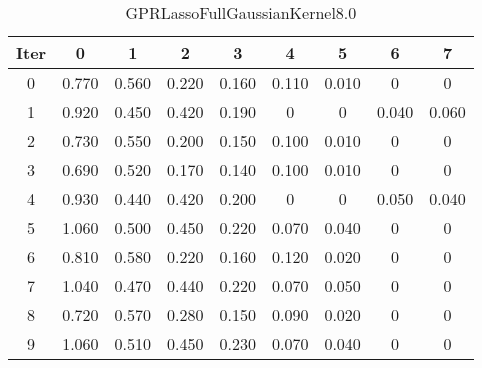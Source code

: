 \begin{table}
	\begin{center}
		\begin{tabular}{|c|c|c|c|c|c|c|c|c|}
			\hline
			Iter & 0 & 1 & 2 & 3 & 4 & 5 & 6 & 7 \\
			\hline
			0 & 0.770 & 0.560 & 0.220 & 0.160 & 0.110 & 0.010 & 0 & 0 \\
			\hline
			1 & 0.920 & 0.450 & 0.420 & 0.190 & 0 & 0 & 0.040 & 0.060 \\
			\hline
			2 & 0.730 & 0.550 & 0.200 & 0.150 & 0.100 & 0.010 & 0 & 0 \\
			\hline
			3 & 0.690 & 0.520 & 0.170 & 0.140 & 0.100 & 0.010 & 0 & 0 \\
			\hline
			4 & 0.930 & 0.440 & 0.420 & 0.200 & 0 & 0 & 0.050 & 0.040 \\
			\hline
			5 & 1.060 & 0.500 & 0.450 & 0.220 & 0.070 & 0.040 & 0 & 0 \\
			\hline
			6 & 0.810 & 0.580 & 0.220 & 0.160 & 0.120 & 0.020 & 0 & 0 \\
			\hline
			7 & 1.040 & 0.470 & 0.440 & 0.220 & 0.070 & 0.050 & 0 & 0 \\
			\hline
			8 & 0.720 & 0.570 & 0.280 & 0.150 & 0.090 & 0.020 & 0 & 0 \\
			\hline
			9 & 1.060 & 0.510 & 0.450 & 0.230 & 0.070 & 0.040 & 0 & 0 \\
			\hline
		\end{tabular}
	\end{center}
	\caption{GPRLassoFullGaussianKernel8.0}
\end{table}